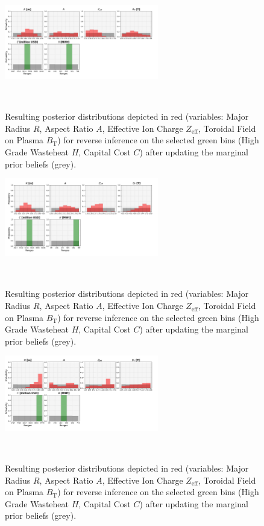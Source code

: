 \begin{figure}[ht]
    \centering
    \includegraphics[width=0.6\textwidth]{figures/TE_results/march_data/config(57)_2outputs_12.png}
    \caption{Resulting posterior distributions depicted in red (variables: Major Radius $R$, Aspect Ratio $A$, Effective Ion Charge $Z_{\text{eff}}$, Toroidal Field on Plasma $B_{\text{T}}$) for reverse
    inference on the selected green bins (High Grade Wasteheat $H$, Capital Cost $C$) after updating the marginal prior beliefs (grey).}~\label{fig:config(57)_2outputs_12}
\end{figure}

\begin{figure}[ht]
    \centering
    \includegraphics[width=0.6\textwidth]{figures/TE_results/march_data/config(57)_2outputs_125.png}
    \caption{Resulting posterior distributions depicted in red (variables: Major Radius $R$, Aspect Ratio $A$, Effective Ion Charge $Z_{\text{eff}}$, Toroidal Field on Plasma $B_{\text{T}}$) for reverse
    inference on the selected green bins (High Grade Wasteheat $H$, Capital Cost $C$) after updating the marginal prior beliefs (grey).}~\label{fig:config(57)_2outputs_125}
\end{figure}

\begin{figure}[ht]
    \centering
    \includegraphics[width=0.6\textwidth]{figures/TE_results/march_data/config(57)_2outputs_16.png}
    \caption{Resulting posterior distributions depicted in red (variables: Major Radius $R$, Aspect Ratio $A$, Effective Ion Charge $Z_{\text{eff}}$, Toroidal Field on Plasma $B_{\text{T}}$) for reverse
    inference on the selected green bins (High Grade Wasteheat $H$, Capital Cost $C$) after updating the marginal prior beliefs (grey).}~\label{fig:config(57)_2outputs_16}
\end{figure}

